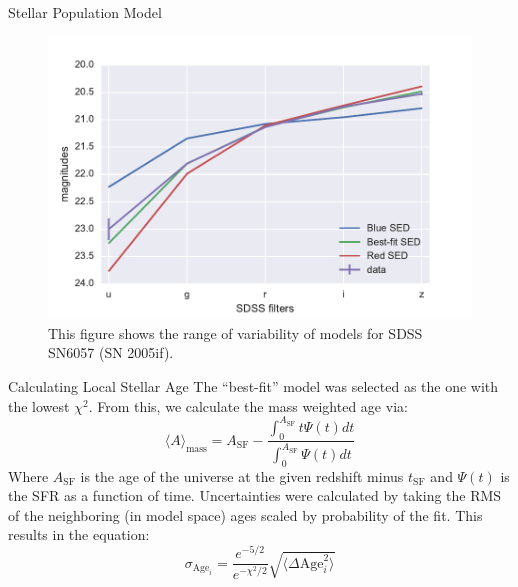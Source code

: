 \documentclass[final]{beamer}
\newlength{\onecolwid}
\begin{document}
\begin{frame}[t]
\begin{columns}[t]
\begin{column}{\onecolwid}
\begin{block}{Stellar Population Model}
\begin{figure}
    \begin{minipage}[c]{0.55\onecolwid}
        \includegraphics[width=0.67\onecolwid]{SN6057-Model-Variability.pdf}
    \end{minipage}\hfill
    \begin{minipage}[c]{0.35\onecolwid}
    \caption{This figure shows the range of variability of models for SDSS SN6057 (SN 2005if).} \label{fig:diverse}
  \end{minipage}
\end{figure}

\begin{block}{Calculating Local Stellar Age}
The ``best-fit'' model was selected as the one with the lowest $\chi^2$. From this, we calculate the mass weighted age via:
\begin{equation}
    \langle A \rangle_{\text{mass}}= A_{\text{SF}} - \frac{\int^{A_{\text{SF}}}_{0}t\Psi(t)dt}{\int^{A_{\text{SF}}}_{0}\Psi(t)dt}
\end{equation}
Where $A_{\text{SF}}$ is the age of the universe at the given redshift minus $t_{\text{SF}}$ and $\Psi(t)$ is the SFR as a function of time.
Uncertainties were calculated by taking the RMS of the neighboring (in model space) ages scaled by probability of the fit. This results in the equation:
\begin{equation}
    \sigma_{\text{Age}_{i}} = \frac{e^{-5/2}}{e^{-\chi^2/2}} \sqrt{\langle \Delta \text{Age}_i^2\rangle}
\end{equation}
\end{block}



\end{block}
\end{column}
\end{columns}
\end{frame}
\end{document}
